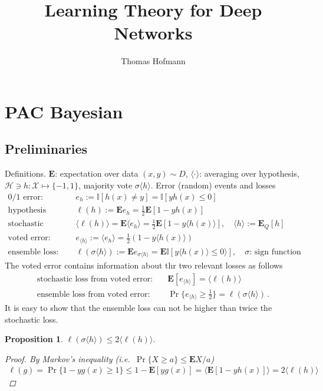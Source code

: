 \documentclass[10pt,a4paper]{article}
\author{Thomas Hofmann}
\title{Learning Theory for Deep Networks}
\newtheorem{proposition}{Proposition}
\newcommand{\E}{{\mathbf{E}}}
\newcommand{\bI}{{\mathbb I}}
\newcommand{\lh}{{\langle h \rangle}}
\newcommand{\lhx}{{\langle h(x) \rangle}}
\begin{document}
\maketitle

\section{PAC Bayesian}


\subsection{Preliminaries}
Definitions. $\E$: expectation over data $(x,y) \sim D$, $\langle \cdot \rangle$: averaging over hypothesis, $\mathcal H \ni h: \mathcal X \mapsto \{ -1,1\}$, majority vote $\sigma\lh$. Error (random) events and losses 
\begin{align}
\text{0/1 error:}   		&\quad 	e_h := \bI[h(x) \neq y]= \mathbb I [y h(x) \le 0]
\\
\text{hypothesis loss:}	&\quad	\ell(h) := \E e_h = \tfrac 12 \E[1-yh(x)]  
\\
\text{stochastic loss:} 	&\quad	\langle \ell(h) \rangle =  \E \langle e_h \rangle  = \tfrac 12 \E[1-y\lhx], \quad \langle h \rangle := \E_Q[h]
\\
\text{voted error:} 		&\quad  	e_{\lh} := \langle e_h \rangle  = \tfrac 12 (1- y \lhx) 
\\
\text{ensemble loss:}		&\quad 	\ell(\sigma \lh) := \E e_{\sigma\lh} = \E \mathbb I[ y \lhx \le 0\rangle], \quad \text{$\sigma$: sign function}
\end{align}
The voted error contains information about thr two relevant losses as follows
\begin{align}
\text{stochastic loss from voted error:}	&\quad  \E[e_{\langle h \rangle}] = \langle \ell(h) \rangle\\
\text{ensemble loss from voted error:}	&\quad  \Pr \{ e_{\langle h \rangle} \ge \tfrac 12 \} = \ell(\sigma \langle h \rangle) \,.
\end{align}
It is easy to show that the ensemble loss can not be higher than twice the stochastic loss. 
\begin{proposition}
$\ell(\sigma \langle h \rangle) \le 2  \langle \ell(h) \rangle.$
\begin{proof} 
By Markov's inequality (i.e.~$ \Pr\{ X \ge a \} \le \E X/a$)
\begin{align}
\ell(g) = \Pr\{ 1 - y g(x)  \ge 1\} \le 1 - \E[y g(x)] =  \langle \E[1- y h(x)] \rangle = 2\langle \ell(h) \rangle 
\end{align}
\end{proof}
\end{proposition}
\end{document}
